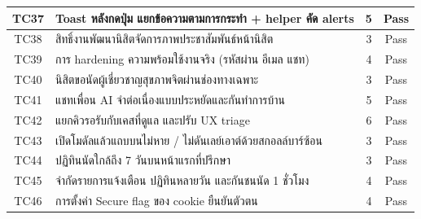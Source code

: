 \documentclass[11pt,a4paper]{article}
\begin{document}
\begin{center}
\begin{tabularx}{0.92\linewidth}{|c|Y|c|c|}
\hline
TC37 & Toast หลังกดปุ่ม แยกข้อความตามการกระทำ + helper คัด alerts & 5 & Pass \\
\hline
TC38 & สิทธิ์งานพัฒนานิสิตจัดการภาพประชาสัมพันธ์หน้านิสิต & 3 & Pass \\
\hline
TC39 & การ hardening ความพร้อมใช้งานจริง (รหัสผ่าน อีเมล แชท) & 4 & Pass \\
\hline
TC40 & นิสิตขอนัดผู้เชี่ยวชาญสุขภาพจิตผ่านช่องทางเฉพาะ & 3 & Pass \\
\hline
TC41 & แชทเพื่อน AI จำต่อเนื่องแบบประหยัดและกันทำการบ้าน & 5 & Pass \\
\hline
TC42 & แยกคิวรอรับกับเคสที่ดูแล และปรับ UX triage & 6 & Pass \\
\hline
TC43 & เปิดโมดัลแล้วแถบบนไม่หาย / ไม่ดันเลย์เอาต์ด้วยสกอลล์บาร์ซ้อน & 3 & Pass \\
\hline
TC44 & ปฏิทินนัดใกล้ถึง 7 วันบนหน้าแรกที่ปรึกษา & 3 & Pass \\
\hline
TC45 & จำกัดรายการแจ้งเตือน ปฏิทินหลายวัน และกันชนนัด 1 ชั่วโมง & 4 & Pass \\
\hline
TC46 & การตั้งค่า Secure flag ของ cookie ยืนยันตัวตน & 4 & Pass \\
\hline
\end{tabularx}
\end{center}

\clearpage

\end{document}
